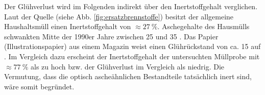 Der Glühverlust wird im Folgenden indirekt über den Inertstoffgehalt verglichen. Laut der Quelle (siehe Abb. \ref{fig:ersatzbrennstoffe}) besitzt der allgemeine Haushaltsmüll einen Inertstoffgehalt von $\approx \SI{27}{\percent}$. 
Aschegehalte des Hausmülls schwankten Mitte der 1990er Jahre zwischen \SI{25}{\mpercent} und \SI{35}{\mpercent} \cite{scholz2013}.
Das Papier (Illustrationspapier) aus einem Magazin weist einen Glührückstand von ca. \SI{15}{\mpercent} auf \cite{roempppap}.
Im Vergleich dazu erscheint der Inertstoffgehalt der untersuchten Müllprobe mit $\approx \SI{77}{\percent}$ als zu hoch bzw. der Glühverlust im Vergleich als niedrig. Die Vermutung, dass die optisch ascheähnlichen Bestandteile tatsächlich inert sind, wäre somit begründet.\\ \\





